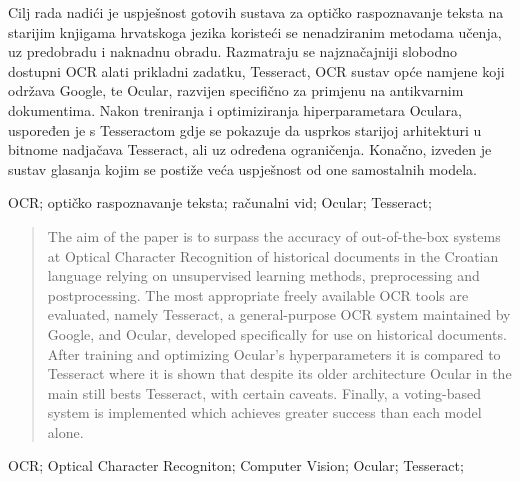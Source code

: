\documentclass[zavrsnirad]{fer}
\begin{document}

\begin{sazetak}
  Cilj rada nadići je uspješnost gotovih sustava za optičko raspoznavanje teksta na starijim knjigama hrvatskoga jezika koristeći se nenadziranim metodama učenja, uz predobradu i naknadnu obradu. Razmatraju se najznačajniji slobodno dostupni OCR alati prikladni zadatku, Tesseract, OCR sustav opće namjene koji održava Google, te Ocular, razvijen specifično za primjenu na antikvarnim dokumentima. Nakon treniranja i optimiziranja hiperparametara Oculara, uspoređen je s Tesseractom gdje se pokazuje da usprkos starijoj arhitekturi u bitnome nadjačava Tesseract, ali uz određena ograničenja. Konačno, izveden je sustav glasanja kojim se postiže veća uspješnost od one samostalnih modela.
\end{sazetak}

\begin{kljucnerijeci}
  OCR; optičko raspoznavanje teksta; računalni vid; Ocular; Tesseract;
\end{kljucnerijeci}


\begin{abstract}
  The aim of the paper is to surpass the accuracy of out-of-the-box systems at Optical Character Recognition of historical documents in the Croatian language relying on unsupervised learning methods, preprocessing and postprocessing. The most appropriate freely available OCR tools are evaluated, namely Tesseract, a general-purpose OCR system maintained by Google, and Ocular, developed specifically for use on historical documents. After training and optimizing Ocular's hyperparameters it is compared to Tesseract where it is shown that despite its older architecture Ocular in the main still bests Tesseract, with certain caveats. Finally, a voting-based system is implemented which achieves greater success than each model alone.
\end{abstract}

\begin{keywords}
  OCR; Optical Character Recogniton; Computer Vision; Ocular; Tesseract;
\end{keywords}



\end{document}
